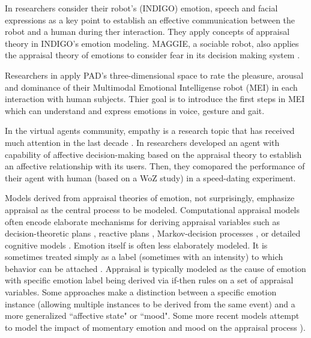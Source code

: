 \documentclass[11pt]{article}
\begin{document}
In \cite{vogiatzis:robot-museum} researchers consider their robot's (INDIGO)
emotion, speech and facial expressions as a key point to establish an effective
communication between the robot and a human during ther interaction. They apply
concepts of appraisal theory in INDIGO's emotion modeling. MAGGIE, a sociable
robot, also applies the appraisal theory of emotions to consider fear in its
decision making system \cite{castro:autonomous-robot-fear}.

Researchers in \cite{lim:mei-motherese-ei} apply PAD's three-dimensional space
to rate the pleasure, arousal and dominance of their Multimodal Emotional
Intelligense robot (MEI) in each interaction with human subjects. Thier goal is
to introduce the first steps in MEI which can understand and express emotions in
voice, gesture and gait.

In the virtual agents community, empathy is a research topic that has received
much attention in the last decade \cite{paiva:agent-care}
\cite{prendinger:empathic-companion} \cite{bickmore:longterm-relationship}
\cite{brave:emotion-hci} \cite{scott:modeling-empathy-agent}. In
\cite{pontier:women-robot-men} researchers developed an agent with capability of
affective decision-making based on the appraisal theory to establish an
affective relationship with its users. Then, they comopared the performance of
their agent with human (based on a WoZ study) in a speed-dating experiment.

Models derived from appraisal theories of emotion, not surprisingly, emphasize
appraisal as the central process to be modeled. Computational appraisal models
often encode elaborate mechanisms for deriving appraisal variables such as
decision-theoretic plans \cite{gratch:domain-independent}
\cite{marsella:ema-process-model}, reactive plans
\cite{rank:appraisal-story-world} \cite{neal:modeling-antecedents}
\cite{staller:emotion-social-norm}, Markov-decision processes
\cite{elnasr:flame} \cite{si:modeling-appraisal-tom-journal}, or detailed
cognitive models \cite{marinier:behavior-emotion}. Emotion itself is often less
elaborately modeled. It is sometimes treated simply as a label (sometimes with
an intensity) to which behavior can be attached
\cite{elliott:affective-reasoner}. Appraisal is typically modeled as the cause
of emotion with specific emotion label being derived via if-then rules on a set
of appraisal variables. Some approaches make a distinction between a specific
emotion instance (allowing multiple instances to be derived from the same event)
and a more generalized ``affective state" or ``mood". Some more recent models
attempt to model the impact of momentary emotion and mood on the appraisal
process \cite{gebhard:alma}
\cite{gratch:domain-independent}
\cite{marsella:ema-process-model} \cite{paiva:learning-feeling}).
\end{document}
